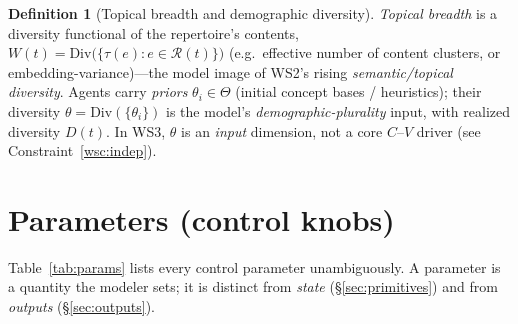 \documentclass[11pt,letterpaper]{article}
\theoremstyle{definition}
\newtheorem{definition}{Definition}[section]
\theoremstyle{plain}
\newcommand{\R}{\mathcal{R}}
\begin{document}
\begin{definition}[Topical breadth and demographic diversity]\label{def:breadth}
\emph{Topical breadth} is a diversity functional of the repertoire's contents,
$W(t) = \mathrm{Div}\big(\{\tau(e) : e\in\R(t)\}\big)$ (e.g.\ effective number of
content clusters, or embedding-variance)---the model image of WS2's rising
\emph{semantic/topical diversity}. Agents carry \emph{priors}
$\theta_i\in\Theta$ (initial concept bases / heuristics); their diversity
$\theta=\mathrm{Div}(\{\theta_i\})$ is the model's \emph{demographic-plurality}
input, with realized diversity $D(t)$. In WS3, $\theta$ is an \emph{input}
dimension, not a core $C$--$V$ driver (see Constraint~\ref{wsc:indep}).
\end{definition}

\section{Parameters (control knobs)}\label{sec:params}

Table~\ref{tab:params} lists every control parameter unambiguously. A parameter
is a quantity the modeler sets; it is distinct from \emph{state} (\S\ref{sec:primitives})
and from \emph{outputs} (\S\ref{sec:outputs}).
\end{document}
